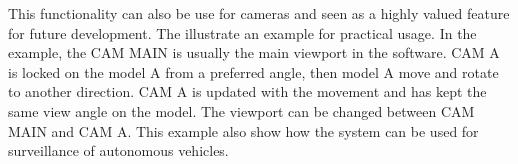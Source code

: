 This functionality can also be use for cameras and seen as a highly valued feature for future development. The  illustrate an example for practical usage. In the example, the CAM MAIN is usually the main viewport in the software. CAM A is locked on the model A from a preferred angle, then model A move and rotate to another direction. CAM A is updated with the movement and has kept the same view angle on the model. The viewport can be changed between CAM MAIN and CAM A. This example also show how the system can be used for surveillance of autonomous vehicles. 